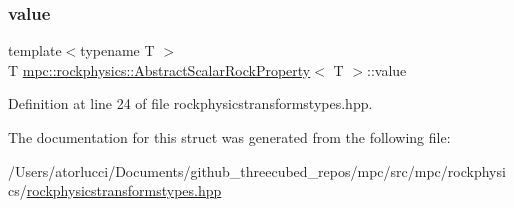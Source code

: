 \subsubsection{\texorpdfstring{value}{value}}
{\footnotesize\ttfamily template$<$typename T $>$ \\
T \mbox{\hyperlink{structmpc_1_1rockphysics_1_1_abstract_scalar_rock_property}{mpc\+::rockphysics\+::\+Abstract\+Scalar\+Rock\+Property}}$<$ T $>$\+::value}



Definition at line 24 of file rockphysicstransformstypes.\+hpp.



The documentation for this struct was generated from the following file\+:\begin{DoxyCompactItemize}
\item 
/\+Users/atorlucci/\+Documents/github\+\_\+threecubed\+\_\+repos/mpc/src/mpc/rockphysics/\mbox{\hyperlink{rockphysicstransformstypes_8hpp}{rockphysicstransformstypes.\+hpp}}\end{DoxyCompactItemize}
